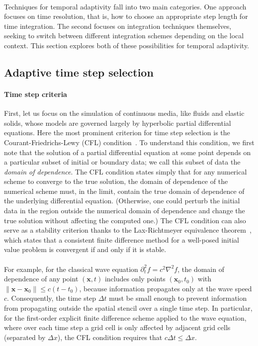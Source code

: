 \paragraph*{}
Techniques for temporal adaptivity fall into two main categories.
One approach focuses on time resolution, that is, how to choose an appropriate step length for time integration.
The second focuses on integration techniques themselves, seeking to switch between different integration schemes depending on the local context. 
This section explores both of these possibilities for temporal adaptivity.

\subsection{Adaptive time step selection}

\paragraph*{Time step criteria}
First, let us focus on the simulation of continuous media, like fluids and elastic solids, whose models are governed largely by hyperbolic partial differential equations.
Here the most prominent criterion for time step selection is the Courant-Friedrichs-Lewy (CFL) condition~\cite{Courant1928}.
To understand this condition, we first note that the solution of a partial differential equation at some point depends on a particular subset of initial or boundary data; we call this subset of data the \emph{domain of dependence}.
The CFL condition states simply that for any numerical scheme to converge to the true solution, the domain of dependence of the numerical scheme must, in the limit, contain the true domain of dependence of the underlying differential equation.
(Otherwise, one could perturb the initial data in the region outside the numerical domain of dependence and change the true solution without affecting the computed one.)
The CFL condition can also serve as a stability criterion thanks to the Lax-Richtmeyer equivalence theorem~\cite{Lax1956,Strikwerda2004}, which states that a consistent finite difference method for a well-posed initial value problem is convergent if and only if it is stable.
\paragraph*{}
For example, for the classical wave equation $\partial_t^2 f = c^2\nabla^2 f$, the domain of dependence of any point $(\mathbf x, t)$ includes only points $(\mathbf x_0, t_0)$ with $\|\mathbf x-\mathbf x_0\|\le c(t-t_0)$, because information propagates only at the wave speed $c$.
Consequently, the time step $\Delta t$ must be small enough to prevent information from propagating outside the spatial stencil over a single time step.
In particular, for the first-order explicit finite difference scheme applied to the wave equation, where over each time step a grid cell is only affected by adjacent grid cells (separated by $\Delta x$), the CFL condition requires that $c\Delta t \le \Delta x$.

